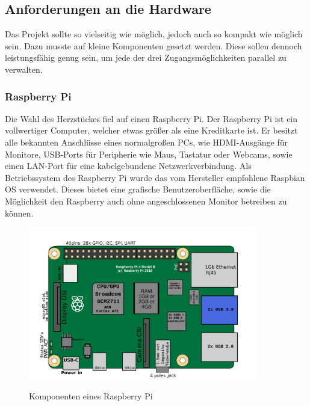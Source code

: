 \subsection{Anforderungen an die Hardware}
Das Projekt sollte so vielseitig wie möglich, jedoch auch so kompakt wie möglich sein. Dazu musste auf kleine Komponenten gesetzt werden. Diese sollen dennoch leistungsfähig genug sein, um jede der drei Zugangsmöglichkeiten parallel zu verwalten.
\subsubsection{Raspberry Pi}
Die Wahl des Herzstückes fiel auf einen Raspberry Pi.
Der Raspberry Pi ist ein vollwertiger Computer, welcher etwas größer als eine Kreditkarte ist. Er besitzt alle bekannten Anschlüsse eines normalgroßen PCs, wie HDMI-Ausgänge für Monitore, USB-Ports für Peripherie wie Maus, Tastatur oder Webcams, sowie einen LAN-Port für eine kabelgebundene Netzwerkverbindung.
Als Betriebssystem des Raspberry Pi wurde das vom Hersteller empfohlene Raspbian OS verwendet. Dieses bietet eine grafische Benutzeroberfläche, sowie die Möglichkeit den Raspberry auch ohne angeschlossenen Monitor betreiben zu können. \cite{WhatIsRaspberryPi}
\begin{figure}[H]
  \centering
  \includegraphics[width=10cm]{pics/2560px-RaspberryPi_4_Model_B.svg.png}
  \caption{Komponenten eines Raspberry Pi}
  \cite{RaspberryImage}
  \end{figure}


